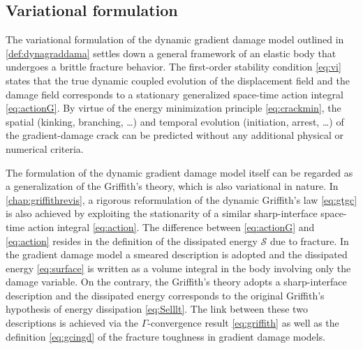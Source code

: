 \subsection{Variational formulation}
The variational formulation of the dynamic gradient damage model outlined in \cref{def:dynagraddama} settles down a general framework of an elastic body that undergoes a brittle fracture behavior. The first-order stability condition \cref{eq:vi} states that the true dynamic coupled evolution of the displacement field and the damage field corresponds to a stationary generalized space-time action integral \eqref{eq:actionG}. By virtue of the energy minimization principle \cref{eq:crackmin}, the spatial (kinking, branching, \ldots) and temporal evolution (initiation, arrest, \ldots) of the gradient-damage crack can be predicted without any additional physical or numerical criteria.

The formulation of the dynamic gradient damage model itself can be regarded as a generalization of the Griffith's theory, which is also variational in nature. In \cref{chap:griffithrevis}, a rigorous reformulation of the dynamic Griffith's law \eqref{eq:gtgc} is also achieved by exploiting the stationarity of a similar sharp-interface space-time action integral \eqref{eq:action}. The difference between \eqref{eq:actionG} and \eqref{eq:action} resides in the definition of the dissipated energy $\mathcal{S}$ due to fracture. In the gradient damage model a smeared description is adopted and the dissipated energy \eqref{eq:surface} is written as a volume integral in the body involving only the damage variable. On the contrary, the Griffith's theory adopts a sharp-interface description and the dissipated energy corresponds to the original Griffith's hypothesis of energy dissipation \eqref{eq:Selllt}. The link between these two descriptions is achieved via the $\Gamma$-convergence result \eqref{eq:griffith} as well as the definition \eqref{eq:gcingd} of the fracture toughness in gradient damage models.

